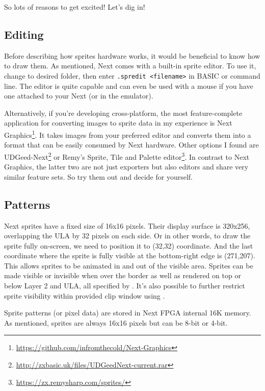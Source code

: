 So lots of reasons to get excited! Let's dig in!

\subsection{Editing}

Before describing how sprites hardware works, it would be beneficial to know how to draw them. As mentioned, Next comes with a built-in sprite editor. To use it, change to desired folder, then enter {\tt .spredit <filename>} in BASIC or command line. The editor is quite capable and can even be used with a mouse if you have one attached to your Next (or in the emulator).

Alternatively, if you're developing cross-platform, the most feature-complete application for converting images to sprite data in my experience is Next Graphics\footnote{\url{https://github.com/infromthecold/Next-Graphics}}. It takes images from your preferred editor and converts them into a format that can be easily consumed by Next hardware. Other options I found are UDGeed-Next\footnote{\url{http://zxbasic.uk/files/UDGeedNext-current.rar}} or Remy's Sprite, Tile and Palette editor\footnote{\url{https://zx.remysharp.com/sprites/}}. In contrast to Next Graphics, the latter two are not just exporters but also editors and share very similar feature sets. So try them out and decide for yourself.


\subsection{Patterns}

Next sprites have a fixed size of 16x16 pixels. Their display surface is 320x256, overlapping the ULA by 32 pixels on each side. Or in other words, to draw the sprite fully on-screen, we need to position it to (32,32) coordinate. And the last coordinate where the sprite is fully visible at the bottom-right edge is (271,207). This allows sprites to be animated in and out of the visible area. Sprites can be made visible or invisible when over the border as well as rendered on top or below Layer 2 and ULA, all specified by . It's also possible to further restrict sprite visibility within provided clip window using .

Sprite patterns (or pixel data) are stored in Next FPGA internal 16K memory. As mentioned, sprites are always 16x16 pixels but can be 8-bit or 4-bit.


